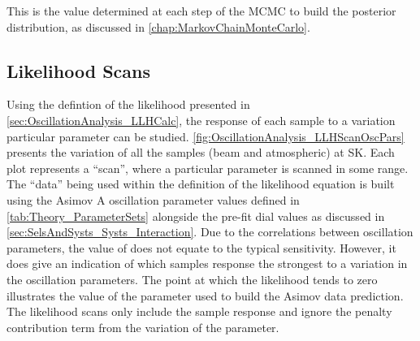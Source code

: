 This is the value determined at each step of the MCMC to build the posterior distribution, as discussed in \autoref{chap:MarkovChainMonteCarlo}.

\subsection{Likelihood Scans}
\label{sec:OscillationAnalysis_LLHScans}

Using the defintion of the likelihood presented in \autoref{sec:OscillationAnalysis_LLHCalc}, the response of each sample to a variation particular parameter can be studied. \autoref{fig:OscillationAnalysis_LLHScanOscPars} presents the variation of all the samples (beam and atmospheric) at SK. Each plot represents a ``scan'', where a particular parameter is scanned in some range. The ``data'' being used within the definition of the likelihood equation is built using the Asimov A oscillation parameter values defined in \autoref{tab:Theory_ParameterSets} alongside the pre-fit dial values as discussed in \autoref{sec:SelsAndSysts_Systs_Interaction}. Due to the correlations between oscillation parameters, the value of  does not equate to the typical \quickmath{1\sigma} sensitivity. However, it does give an indication of which samples response the strongest to a variation in the oscillation parameters. The point at which the likelihood tends to zero illustrates the value of the parameter used to build the Asimov data prediction. The likelihood scans only include the sample response and ignore the penalty contribution term from the variation of the parameter.

